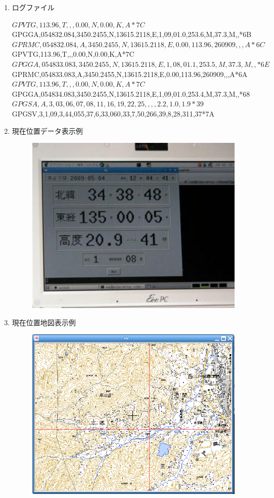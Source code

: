 \documentclass[mingoth,a4paper]{jsarticle}
\begin{document}
\begin{enumerate}
\item ログファイル
\begin{commandline}
$GPVTG,113.96,T,,,0.00,N,0.00,K,A*7C 
$GPGGA,054832.084,3450.2455,N,13615.2118,E,1,09,01.0,253.6,M,37.3,M,,*6B 
$GPRMC,054832.084,A,3450.2455,N,13615.2118,E,0.00,113.96,260909,,,A*6C 
$GPVTG,113.96,T,,,0.00,N,0.00,K,A*7C 
$GPGGA,054833.083,3450.2455,N,13615.2118,E,1,08,01.1,253.5,M,37.3,M,,*6E 
$GPRMC,054833.083,A,3450.2455,N,13615.2118,E,0.00,113.96,260909,,,A*6A 
$GPVTG,113.96,T,,,0.00,N,0.00,K,A*7C 
$GPGGA,054834.083,3450.2455,N,13615.2118,E,1,09,01.0,253.4,M,37.3,M,,*68 
$GPGSA,A,3,03,06,07,08,11,16,19,22,25,,,,2.2,1.0,1.9*39 
$GPGSV,3,1,09,3,44,055,37,6,33,060,33,7,50,266,39,8,28,311,37*7A
\end{commandline}
\item 現在位置データ表示例
\begin{figure}[h!]
    \centering
    \includegraphics[scale=0.6]{image200912/handmadegpsloger1.jpg}
\end{figure}
\item 現在位置地図表示例
\begin{figure}[h!]
    \centering
    \includegraphics[scale=0.6]{image200912/handmadegpsloger2.png}

\end{figure}
\end{enumerate}
\end{document}
